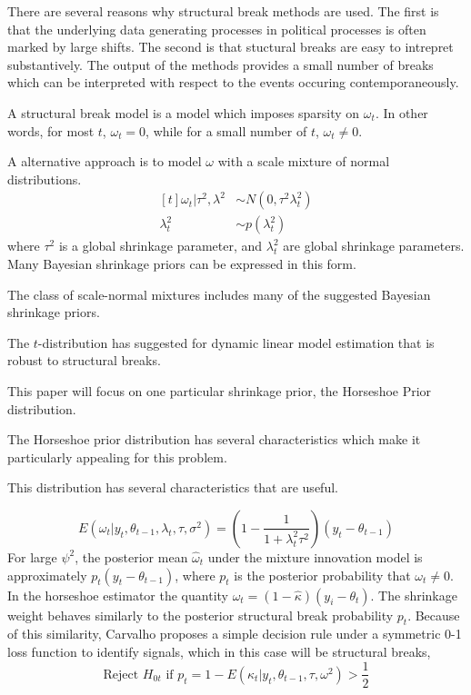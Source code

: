 \documentclass{article}
\begin{document}
There are several reasons why structural break methods are used.
The first is that the underlying data generating processes in political processes is often marked by large shifts.
The second is that stuctural breaks are easy to intrepret substantively.
The output of the methods provides a small number of breaks which can be interpreted with respect to the events occuring contemporaneously.

A structural break model is a model which imposes sparsity on $\omega_{t}$. 
In other words, for most $t$, $\omega_{t} = 0$, while for a small number of $t$, $\omega_{t} \neq 0$.

A alternative approach is to model $\omega$ with a scale mixture of normal distributions.
\begin{equation}
  \label{eq:6}
  \begin{aligned}[t]
    \omega_{t} | \tau^{2}, \lambda^{2} & \sim N(0, \tau^{2} \lambda_{t}^{2}) \\
    \lambda_{t}^{2} & \sim p(\lambda^{2}_{t})
  \end{aligned}
\end{equation}
where $\tau^{2}$ is a global shrinkage parameter, and $\lambda_{t}^{2}$ are global shrinkage parameters.
Many Bayesian shrinkage priors can be expressed in this form. 

The class of scale-normal mixtures includes many of the suggested Bayesian shrinkage priors.

The $t$-distribution has suggested for dynamic linear model estimation that is robust to structural breaks.

This paper will focus on one particular shrinkage prior, the Horseshoe Prior distribution.

The Horseshoe prior distribution has several characteristics which make it particularly appealing for this problem.

This distribution has several characteristics that are useful.

\begin{equation}
  \label{eq:10}
  E(\omega_{t} | y_{t}, \theta_{t-1}, \lambda_{t}, \tau, \sigma^{2}) =
  \left(
    1 - \frac{1}{1 + \lambda_{t}^{2} \tau^{2}}
  \right) (y_{t} - \theta_{t - 1})
\end{equation}
For large $\psi^{2}$, the posterior mean $\hat\omega_{t}$ under the mixture innovation model is 
approximately $p_{t} (y_{t} - \theta_{t-1})$, where $p_{t}$ is the posterior probability that $\omega_{t} \neq 0$.
In the horseshoe estimator the quantity $\hat \omega_{t} = (1 - \hat \kappa) (y_{i} - \theta_{t})$.
The shrinkage weight behaves similarly to the posterior structural break probability $p_{t}$.
Because of this similarity, Carvalho proposes a simple decision rule under a symmetric 0-1 loss function
to identify signals, which in this case will be structural breaks,
\begin{equation}
  \label{eq:11}
  \text{Reject $H_{0t}$ if $p_{t} = 1 - E(\kappa_{t} | y_{t}, \theta_{t-1}, \tau, \omega^{2})$} > \frac{1}{2}
\end{equation}
\end{document}
